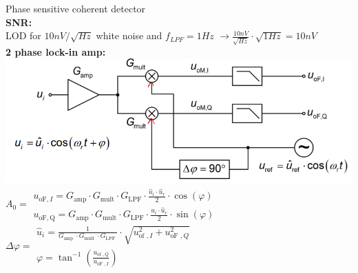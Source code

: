 \documentclass[5pt]{article}
\begin{document}
\begin{multicols*}{4}
Phase sensitive coherent detector\\
\textbf{SNR:}\\
LOD for $ 10nV/ \sqrt{Hz} $ white noise and $ f_{LPF} = 1Hz$ $ \rightarrow \frac{10nV}{\sqrt{Hz}} \cdot \sqrt{1Hz} = 10nV$\\
\textbf{2 phase lock-in amp:}\\
\includegraphics[width=\columnwidth]{images/two_phase_lockin.png}\\
$A_0 = \begin{array}{l}
u_{\mathrm{oF}, I}=G_{\mathrm{amp}} \cdot G_{\mathrm{mult}} \cdot G_{\mathrm{LPF}} \cdot \frac{\hat{u}_{i} \cdot \hat{u}_{r}}{2} \cdot \cos (\varphi) \\
u_{\mathrm{oF}, \mathrm{Q}}=G_{\mathrm{amp}} \cdot G_{\mathrm{mult}} \cdot G_{\mathrm{LPF}} \cdot \frac{\hat{u}_{i} \cdot \hat{u}_{r}}{2} \cdot \sin (\varphi)
\end{array} $\\
$ \Delta \varphi =\begin{array}{l}
\hat{u}_{i}=\frac{1}{G_{\text {amp }} \cdot G_{\text {mult }} \cdot G_{\text {LPF }}} \cdot \sqrt{u_{\text {of }, I}^{2}+u_{\text {oF }, Q}^{2}} \\
\varphi=\tan ^{-1}\left(\frac{u_{\text {of }, Q}}{u_{\text {oF }, I}}\right)
\end{array} $\\

\end{multicols*}
\end{document}
